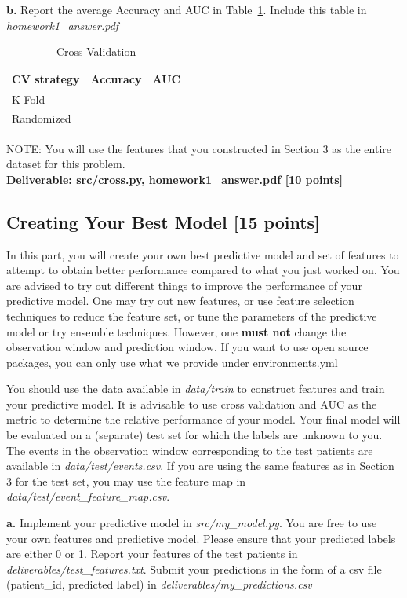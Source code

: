\documentclass[12pt]{article}
\begin{document}
\textbf{b.} Report the average Accuracy and AUC in Table~\ref{tbl:cv}. Include this table in \textit{homework1\_answer.pdf}\\
\begin{table}[h]
\centering
\begin{tabular}{@{}lcc@{}}
\toprule
CV strategy & Accuracy & AUC  \\ \midrule
K-Fold & & \\
Randomized & & \\
\bottomrule
\end{tabular}
\caption{Cross Validation}
\label{tbl:cv}
\end{table} 

NOTE: You will use the features that you constructed in Section 3 as the entire dataset for this problem. \\

\textbf{Deliverable: src/cross.py, homework1\_answer.pdf [10 points]}

\subsection{Creating Your Best Model [15 points]}
In this part, you will create your own best predictive model and set of features to attempt to obtain better performance compared to what you just worked on. You are advised to try out different things to improve the performance of your predictive model. One may try out new features, or use feature selection techniques to reduce the feature set, or tune the parameters of the predictive model or try ensemble techniques. However, one \textbf{must not} change the observation window and prediction window. If you want to use open source packages, you can only use what we provide under environments.yml

You should use the data available in \textit{data/train} to construct features and train your predictive model. It is advisable to use cross validation and AUC as the metric to determine the relative performance of your model. Your final model will be evaluated on a (separate) test set for which the labels are unknown to you. The events in the observation window corresponding to the test patients are available in \textit{data/test/events.csv}. If you are using the same features as in Section 3 for the test set, you may use the feature map in \textit{data/test/event\_feature\_map.csv}. 
 
\textbf{a.} Implement your predictive model in \textit{src/my\_model.py}. You are free to use your own features and predictive model. Please ensure that your predicted labels are either 0 or 1. Report your features of the test patients in \textit{deliverables/test\_features.txt}. Submit your predictions in the form of a csv file (patient\_id, predicted label) in  \textit{deliverables/my\_predictions.csv}
\end{document}
